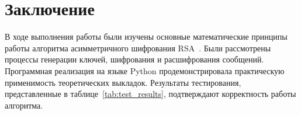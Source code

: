 \section{Заключение}

В ходе выполнения работы были изучены основные математические принципы работы алгоритма асимметричного шифрования RSA~\cite{rsa_original}. Были рассмотрены процессы генерации ключей, шифрования и расшифрования сообщений. Программная реализация на языке Python продемонстрировала практическую применимость теоретических выкладок. Результаты тестирования, представленные в таблице~\ref{tab:test_results}, подтверждают корректность работы алгоритма.
